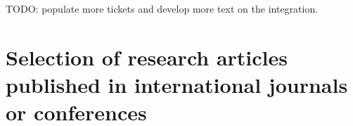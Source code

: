 \documentclass{deliverablereport}
\begin{document}
TODO: populate more tickets and develop more text on the integration.

\renewcommand\refname{List of publications delivered}



\appendix

\section{Selection of research articles published in international journals or conferences}
\label{app:papers}





\end{document}
